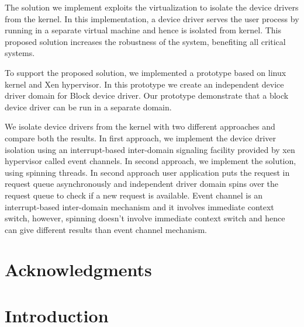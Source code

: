 \documentclass[12pt,dvips]{report}
\begin{document}
The solution we implement exploits the virtualization to isolate the device drivers from the kernel. In this implementation, a device driver serves the user process by running in a separate virtual machine and hence is isolated from kernel. This proposed solution increases the robustness of the system, benefiting all critical systems.
 
To support the proposed solution, we implemented a prototype based on linux kernel and Xen hypervisor. In this prototype we create an independent device driver domain for Block device driver. Our prototype demonstrate that a block device driver can be run in a separate domain. 
 
We isolate device drivers from the kernel with two different approaches and compare both the results. In first approach, we implement the device driver isolation using an interrupt-based inter-domain signaling facility provided by xen hypervisor called event channels. In second approach, we implement the solution, using spinning threads. In second approach user application puts the request in request queue asynchronously and independent driver domain spins over the request queue to check if a new request is available. Event channel is an interrupt-based inter-domain mechanism and it involves immediate context switch, however, spinning doesn't involve immediate context switch and hence can give different results than event channel mechanism. 


\vfill


\pagebreak


\chapter*{Acknowledgments}


\tableofcontents
\pagebreak

\listoffigures
\pagebreak

\listoftables
\pagebreak

\pagestyle{myheadings}


\chapter{Introduction} 
\end{document}
